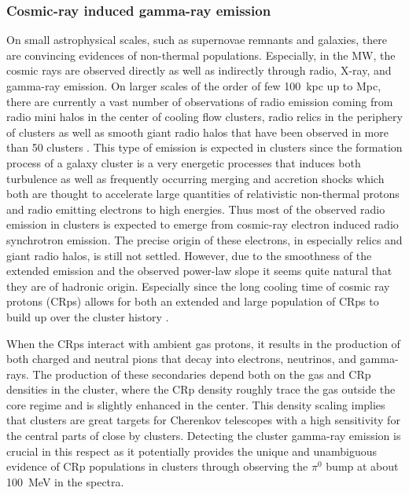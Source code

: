 \documentclass[10pt,aps,pra,reprint,amsmath,amsfonts,amssymb,showpacs]{revtex4-1}
\begin{document}
\subsubsection{Cosmic-ray induced gamma-ray emission}
\label{sect:CRs}
On small astrophysical scales, such as supernovae remnants and
galaxies, there are convincing evidences of non-thermal
populations. Especially, in the MW, the cosmic rays are observed
directly as well as indirectly through radio, X-ray, and gamma-ray
emission. On larger scales of the order of few 100~kpc up to Mpc,
there are currently a vast number of observations of radio emission
coming from radio mini halos in the center of cooling flow clusters,
radio relics in the periphery of clusters \cite{2004rcfg.proc..335K}
as well as smooth giant radio halos that have been observed in more
than 50 clusters \cite{2003ASPC..301..143F,2008SSRv..134...93F}. This
type of emission is expected in clusters since the formation process
of a galaxy cluster is a very energetic processes that induces both
turbulence as well as frequently occurring merging and accretion
shocks which both are thought to accelerate large quantities of
relativistic non-thermal protons and radio emitting electrons to high
energies. Thus most of the observed radio emission in clusters is
expected to emerge from cosmic-ray electron induced radio synchrotron
emission. The precise origin of these electrons, in especially relics
and giant radio halos, is still not settled. However, due to the
smoothness of the extended emission and the observed power-law slope
it seems quite natural that they are of hadronic origin. Especially
since the long cooling time of cosmic ray protons (CRps) allows for
both an extended and large population of CRps to build up over the
cluster history \cite{1997ApJ...487..529B}.

When the CRps interact with ambient gas protons, it results in the
production of both charged and neutral pions that decay into
electrons, neutrinos, and gamma-rays. The production of these
secondaries depend both on the gas and CRp densities in the cluster,
where the CRp density roughly trace the gas outside the core regime and
is slightly enhanced in the center. This density scaling implies that
clusters are great targets for Cherenkov telescopes with a high
sensitivity for the central parts of close by clusters. Detecting the
cluster gamma-ray emission is crucial in this respect as it
potentially provides the unique and unambiguous evidence of CRp
populations in clusters through observing the $\pi^0$ bump at about
100~MeV in the spectra. 
\end{document}
